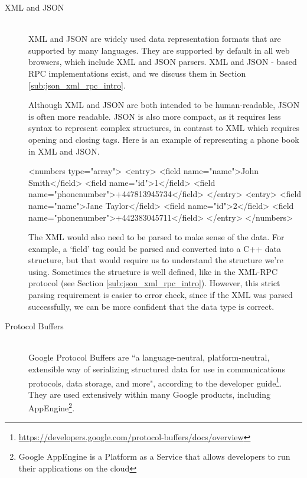 \begin{description}
	\item[XML and JSON] 
	~\\
	XML and JSON are widely used data representation formats that are supported by many languages. They are supported by default in all web browsers, which include XML and JSON parsers. XML and JSON - based RPC implementations exist, and we discuss them in Section \ref{sub:json_xml_rpc_intro}.

	Although XML and JSON are both intended to be human-readable, JSON is often more readable. JSON is also more compact, as it requires less syntax to represent complex structures, in contrast to XML which requires opening and closing tags. Here is an example of representing a phone book in XML and JSON.

	\begin{code}
	\end{code}
	\begin{code}
<numbers type="array">
    <entry>
    	<field name="name">John Smith</field>
    	<field name="id">1</field>
    	<field name="phonenumber">+447813945734</field>
    </entry>
    <entry>
    	<field name="name">Jane Taylor</field>
    	<field name="id">2</field>
    	<field name="phonenumber">+442383045711</field>
    </entry>
</numbers>
	\end{code}

	The XML would also need to be parsed to make sense of the data. For example, a `field' tag could be parsed and converted into a C++ data structure, but that would require us to understand the structure we're using. Sometimes the structure is well defined, like in the XML-RPC protocol (see Section \ref{sub:json_xml_rpc_intro}). However, this strict parsing requirement is easier to error check, since if the XML was parsed successfully, we can be more confident that the data type is correct. 

	\item[Protocol Buffers] 
	~\\
	Google Protocol Buffers are ``a language-neutral, platform-neutral, extensible way of serializing structured data for use in communications protocols, data storage, and more", according to the developer guide\footnote{\label{googleprotobuff}\url{https://developers.google.com/protocol-buffers/docs/overview}}. They are used extensively within many Google products, including AppEngine\footnote{Google AppEngine is a Platform as a Service that allows developers to run their applications on the cloud}. 


\end{description}

